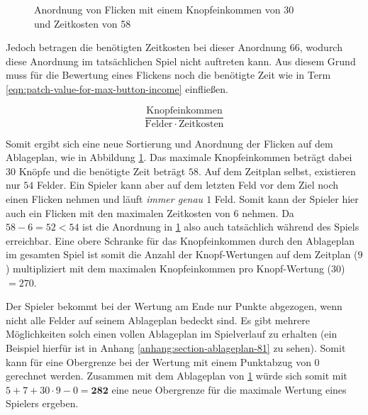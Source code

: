 \begin{figure}[!ht]
\begin{minipage}{.48\textwidth}
        \captionsetup{format=plain, singlelinecheck=false}
        \setcapindent{0pt}
        \caption[Anordnung von Flicken mit Zeitkosten von 58]{Anordnung von Flicken mit einem Knopfeinkommen von 30 \\ und Zeitkosten von 58}
        \label{fig:quilt-board-real-max-button-income}
    \end{minipage}
\end{figure}

Jedoch betragen die benötigten Zeitkosten bei dieser Anordnung $66$, wodurch diese Anordnung im tatsächlichen Spiel nicht auftreten kann. Aus diesem Grund muss für die Bewertung eines Flickens noch die benötigte Zeit wie in Term \ref{eqn:patch-value-for-max-button-income} einfließen.

\begin{equation}
    \label{eqn:patch-value-for-max-button-income}
    \frac{\text{Knopfeinkommen}}{\text{Felder}\, \cdot\, \text{Zeitkosten}}
\end{equation}

Somit ergibt sich eine neue Sortierung und Anordnung der Flicken auf dem Ablageplan, wie in Abbildung \ref{fig:quilt-board-real-max-button-income}. Das maximale Knopfeinkommen beträgt dabei $30$ Knöpfe und die benötigte Zeit beträgt $58$. Auf dem Zeitplan selbst, existieren nur $54$ Felder. Ein Spieler kann aber auf dem letzten Feld vor dem Ziel noch einen Flicken nehmen und läuft \emph{immer genau $1$} Feld. Somit kann der Spieler hier auch ein Flicken mit den maximalen Zeitkosten von $6$ nehmen. Da $58 - 6 = 52 < 54$ ist die Anordnung in \ref{fig:quilt-board-real-max-button-income} also auch tatsächlich während des Spiels erreichbar. Eine obere Schranke für das Knopfeinkommen durch den Ablageplan im gesamten Spiel ist somit die Anzahl der Knopf-Wertungen auf dem Zeitplan ($9$) multipliziert mit dem maximalen Knopfeinkommen pro Knopf-Wertung ($30$) $= 270$.

Der Spieler bekommt bei der Wertung am Ende nur Punkte abgezogen, wenn nicht alle Felder auf seinem Ablageplan bedeckt sind. Es gibt mehrere Möglichkeiten solch einen vollen Ablageplan im Spielverlauf zu erhalten (ein Beispiel hierfür ist in Anhang \ref{anhang:section-ablageplan-81} zu sehen). Somit kann für eine Obergrenze bei der Wertung mit einem Punktabzug von 0 gerechnet werden. Zusammen mit dem Ablageplan von \ref{fig:quilt-board-real-max-button-income} würde sich somit mit $5 + 7 + 30 \cdot 9 - 0 = \boldsymbol{282}$ eine neue Obergrenze für die maximale Wertung eines Spielers ergeben.

